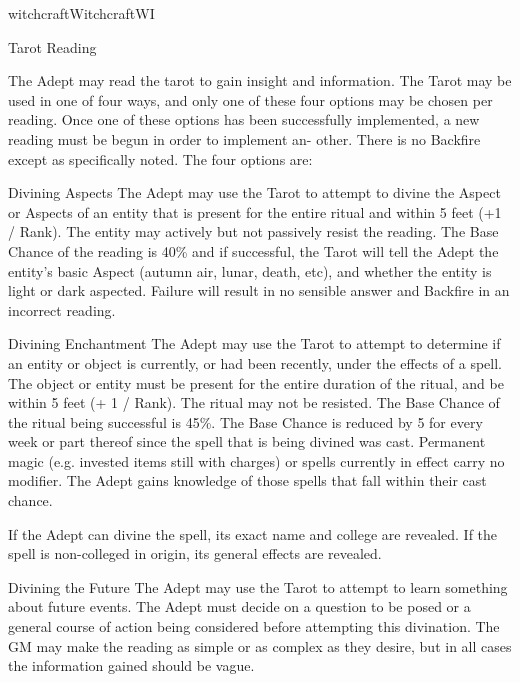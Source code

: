 \begin{College}[1.1]{witchcraft}{Witchcraft}{WI}
\begin{ritual}[Q-2]{Tarot Reading}

\begin{effects}
The Adept may read the tarot to gain insight and information.  The
Tarot may be used in one of four ways, and only one of these four
options may be chosen per reading. Once one of these options has been
successfully implemented, a new reading must be begun in order to
implement an- other.  There is no Backfire except as specifically
noted. The four options are:
\begin{Description}
\item[Divining Aspects] The Adept may use the Tarot to attempt to
  divine the Aspect or Aspects of an entity that is present for the
  entire ritual and within 5 feet (+1 / Rank).  The entity may
  actively but not passively resist the reading.  The Base Chance of
  the reading is 40\% and if successful, the Tarot will tell the Adept
  the entity’s basic Aspect (autumn air, lunar, death, etc), and
  whether the entity is light or dark aspected.  Failure will result
  in no sensible answer and Backfire in an incorrect reading.

\item[Divining Enchantment] The Adept may use the Tarot to attempt to
  determine if an entity or object is currently, or had been recently,
  under the effects of a spell. The object or entity must be present
  for the entire duration of the ritual, and be within 5 feet (+ 1 /
  Rank).  The ritual may not be resisted.  The Base Chance of the
  ritual being successful is 45\%.  The Base Chance is reduced by 5
  for every week or part thereof since the spell that is being divined
  was cast.  Permanent magic (e.g.  invested items still with charges)
  or spells currently in effect carry no modifier.  The Adept gains
  knowledge of those spells that fall within their cast chance.

  If the Adept can divine the spell, its exact name and college are
  revealed.  If the spell is non-colleged in origin, its general
  effects are revealed.

\item[Divining the Future] The Adept may use the Tarot to attempt to
  learn something about future events.  The Adept must decide on a
  question to be posed or a general course of action being considered
  before attempting this divination.  The GM may make the reading as
  simple or as complex as they desire, but in all cases the
  information gained should be vague.


\end{Description}
\end{effects}
\end{ritual}
\end{College}
